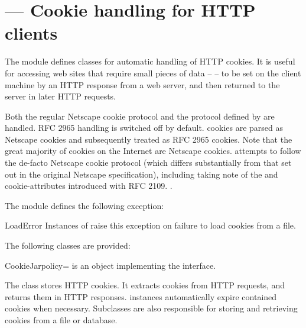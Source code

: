 \section{ ---
         Cookie handling for HTTP clients}



The  module defines classes for automatic handling
of HTTP cookies.  It is useful for accessing web sites that require
small pieces of data --  -- to be set on the client
machine by an HTTP response from a web server, and then returned to
the server in later HTTP requests.

Both the regular Netscape cookie protocol and the protocol defined by
 are handled.  RFC 2965 handling is switched off by default.
 cookies are parsed as Netscape cookies and subsequently
treated as RFC 2965 cookies.  Note that the great majority of cookies
on the Internet are Netscape cookies.   attempts to
follow the de-facto Netscape cookie protocol (which differs
substantially from that set out in the original Netscape
specification), including taking note of the  and
 cookie-attributes introduced with RFC 2109.  .


The module defines the following exception:

\begin{excdesc}{LoadError}
Instances of  raise this exception on failure to
load cookies from a file.
\end{excdesc}


The following classes are provided:

\begin{classdesc}{CookieJar}{policy=}
 is an object implementing the 
interface.

The  class stores HTTP cookies.  It extracts cookies
from HTTP requests, and returns them in HTTP responses.
 instances automatically expire contained cookies
when necessary.  Subclasses are also responsible for storing and
retrieving cookies from a file or database.
\end{classdesc}

